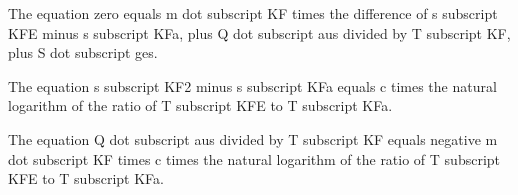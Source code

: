 The equation zero equals m dot subscript KF times the difference of s subscript KFE minus s subscript KFa, plus Q dot subscript aus divided by T subscript KF, plus S dot subscript ges.

The equation s subscript KF2 minus s subscript KFa equals c times the natural logarithm of the ratio of T subscript KFE to T subscript KFa.

The equation Q dot subscript aus divided by T subscript KF equals negative m dot subscript KF times c times the natural logarithm of the ratio of T subscript KFE to T subscript KFa.